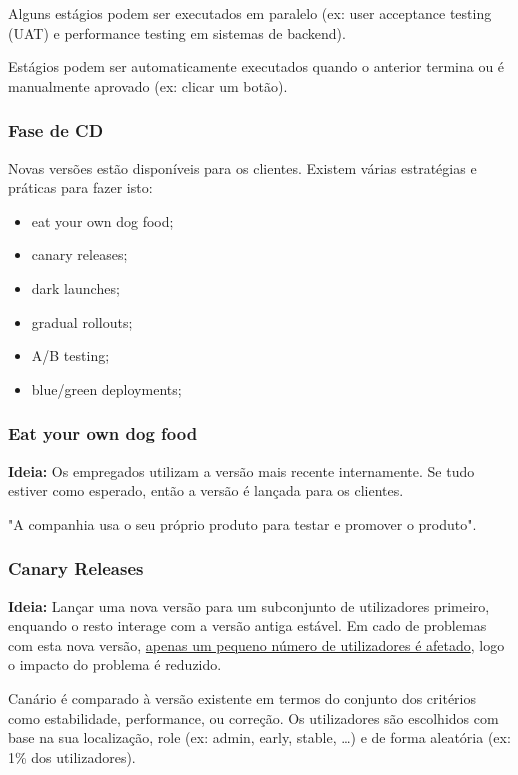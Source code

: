 \documentclass{article}
\begin{document}
Alguns estágios podem ser executados em paralelo (ex: user
acceptance testing (UAT) e performance testing em sistemas de backend).

Estágios podem ser automaticamente executados quando o anterior
termina ou é manualmente aprovado (ex: clicar um botão).

\subsubsection*{Fase de CD}

Novas versões estão disponíveis para os clientes.
Existem várias estratégias e práticas para fazer isto:
\begin{itemize}
  \item eat your own dog food;
  \item canary releases;
  \item dark launches;
  \item gradual rollouts;
  \item A/B testing;
  \item blue/green deployments;
\end{itemize}

\subsubsection{Eat your own dog food}

\begin{flushleft}
  \textbf{Ideia:} Os empregados utilizam a versão mais recente internamente.
  Se tudo estiver como esperado, então a versão é lançada para os clientes.

  \vspace{2mm}

  "A companhia usa o seu próprio produto para testar e promover o produto".
\end{flushleft}

\subsubsection{Canary Releases}

\begin{flushleft}
  \textbf{Ideia:} Lançar uma nova versão para um subconjunto de utilizadores
  primeiro, enquando o resto interage com a versão antiga estável.
  Em cado de problemas com esta nova versão, \uline{apenas um pequeno
  número de utilizadores é afetado}, logo o impacto do problema é reduzido. 

  \vspace{2mm}

  Canário é comparado à versão existente em termos do
  conjunto dos critérios como estabilidade, performance, ou correção.
  Os utilizadores são escolhidos com base na sua localização,
  role (ex: admin, early, stable, \dots) e de forma aleatória
  (ex: 1\% dos utilizadores).
\end{flushleft}
\end{document}

